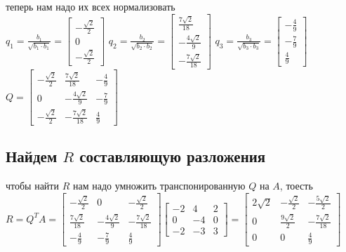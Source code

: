\documentclass{article}
\newcommand{\ds}{\displaystyle}
\renewcommand{\f}{\frac}
\begin{document}
  теперь нам надо их всех нормализовать \\
  $\ds q_1 = \f{b_1}{\sqrt{b_1 \cdot b_1}} = \left[\begin{matrix}- \frac{\sqrt{2}}{2}\\0\\- \frac{\sqrt{2}}{2}\end{matrix}\right]$ \hfill
  $\ds q_2 = \f{b_2}{\sqrt{b_2 \cdot b_2}} = \left[\begin{matrix}\frac{7 \sqrt{2}}{18}\\- \frac{4 \sqrt{2}}{9}\\- \frac{7 \sqrt{2}}{18}\end{matrix}\right]$ \hfill
  $\ds q_3 = \f{b_3}{\sqrt{b_3 \cdot b_3}} = \left[\begin{matrix}- \frac{4}{9}\\- \frac{7}{9}\\\frac{4}{9}\end{matrix}\right]$ \hfill
  $\ds Q = \left[\begin{matrix}- \frac{\sqrt{2}}{2} & \frac{7 \sqrt{2}}{18} & - \frac{4}{9}\\0 & - \frac{4 \sqrt{2}}{9} & - \frac{7}{9}\\- \frac{\sqrt{2}}{2} & - \frac{7 \sqrt{2}}{18} & \frac{4}{9}\end{matrix}\right]$

  \subsection{Найдем $R$ составляющую разложения}
  чтобы найти $R$ нам надо умножить транспонированную $Q$ на $A$, тоесть \\
  $\ds R = Q^TA = \left[\begin{matrix}- \frac{\sqrt{2}}{2} & 0 & - \frac{\sqrt{2}}{2}\\\frac{7 \sqrt{2}}{18} & - \frac{4 \sqrt{2}}{9} & - \frac{7 \sqrt{2}}{18}\\- \frac{4}{9} & - \frac{7}{9} & \frac{4}{9}\end{matrix}\right]\left[\begin{matrix}-2 & 4 & 2\\0 & -4 & 0\\-2 & -3 & 3\end{matrix}\right] = \left[\begin{matrix}2 \sqrt{2} & - \frac{\sqrt{2}}{2} & - \frac{5 \sqrt{2}}{2}\\0 & \frac{9 \sqrt{2}}{2} & - \frac{7 \sqrt{2}}{18}\\0 & 0 & \frac{4}{9}\end{matrix}\right]$
\end{document}

